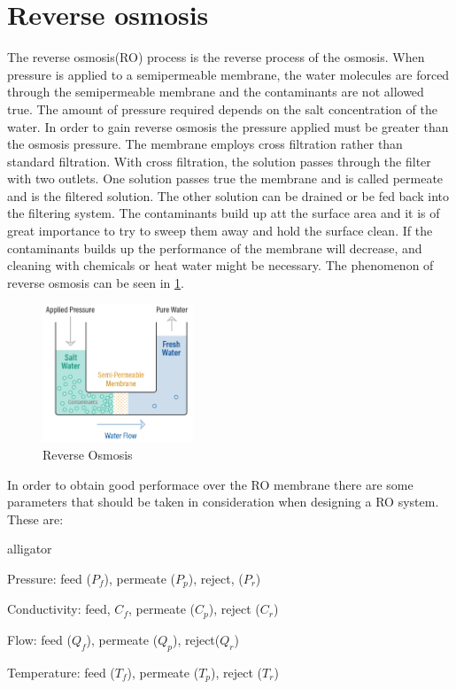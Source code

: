 \section{Reverse osmosis}
\label{RO}
The reverse osmosis(RO) process is the reverse process of the osmosis. When pressure is applied to a semipermeable membrane, the water molecules are forced through the semipermeable membrane and the contaminants are not allowed true. The amount of pressure required depends on the salt concentration of the water. In order to gain reverse osmosis the pressure applied must be greater than the osmosis pressure. The membrane employs cross filtration rather than standard filtration. With cross filtration, the solution passes through the filter with two outlets. One solution passes true the membrane and is called permeate and is the filtered solution. The other solution can be drained or be fed back into the filtering system. The contaminants build up att the surface area and it is of great importance to try to sweep them away and hold the surface clean. If the contaminants builds up the performance of the membrane will decrease, and cleaning with chemicals or heat water might be necessary\cite{Puretech}. The phenomenon of reverse osmosis can be seen in \ref{fig:ReverseOsmosis}.
\begin{figure}[h]
    \centering
    \includegraphics[width=0.4\textwidth]{ReverseOsmosis}
    \caption{Reverse Osmosis}
    \label{fig:ReverseOsmosis}
\end{figure}
In order to obtain good performace over the RO membrane there are some parameters that should be taken in consideration when designing a RO system. These are:

\begin{labeling}{alligator}
\renewcommand\labelitemi{ }
\item [Pressure:]  feed ($P_{f}$), permeate ($P_{p}$), reject, ($P_{r}$)
\item [Conductivity:] feed, $C_{f}$, permeate ($C_{p}$), reject ($C_{r}$)
\item [Flow:] feed ($Q_{f}$), permeate ($Q_{p}$), reject($Q_{r}$)
\item [Temperature:] feed ($T_{f}$), permeate ($T_{p}$), reject ($T_{r}$)
\end{labeling}


